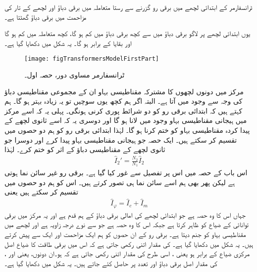 ٹرانسفارمر کے ابتدائی لچھے میں برقی رو   گزرنے سے رستا متعاملہ میں  برقی دباؤ اور لچھے کے تار کی مزاحمت  میں
  برقی دباؤ گھٹتا ہے۔

یوں ابتدائی لچھے  پر لاگو برقی دباؤ  میں سے کچھ برقی دباؤ  میں کم ہو گا،  کچھ  متعاملہ  میں کم ہو گا اور بقایا   کے برابر ہو گا۔  یہ شکل   میں دکھایا گیا ہے۔
\begin{figure}
\centering
\texttt{[image: figTransformersModelFirstPart]}
\caption{ٹرانسفارمر مساوی دور، حصہ اول۔}
\label{شکل_ٹرانسفارمر_ماڈل_حصہ_اول}
\end{figure}
%

مرکز میں دونوں لچھوں کا مشترکہ مقناطیسی بہاو ان کے مجموعی مقناطیسی دباؤ کی وجہ سے وجود میں آتا ہے۔ البتہ اگر ہم کچھ یوں سوچیں تو یہ زیادہ بہتر ہو گا۔ ہم کہتے ہیں کہ ابتدائی برقی رو کو دو شرائط پوری کرنی ہونگی۔ پہلی یہ کہ اسے مرکز میں ہیجانی مقناطیسی بہاو وجود میں لانا ہو گا اور دوسری یہ کہ اسے ثانوی لچھے کے پیدا کردہ مقناطیسی بہاو کو ختم کرنا ہو گا۔ لہٰذا ابتدائی برقی رو کو ہم دو حصوں میں تقسیم کر سکتے ہیں۔ ایک حصہ  جو ہیجانی مقناطیسی بہاو پیدا کرے اور دوسرا  جو ثانوی لچھے کے مقناطیسی دباؤ کے اثر کو ختم کرے۔ لہٰذا
\begin{align}
\hat{I}_2'=\frac{N_2}{N_1} \hat{I}_2
\end{align}
	اس باب کے حصہ   میں اس پر تفصیل سے غور کیا گیا ہے۔ برقی رو  غیر سائن نما ہوتی ہے لیکن پھر بھی  ہم اسے سائن نما   ہی تصور کرتے ہیں۔ اس کو ہم دو حصوں میں تقسیم کر سکتے ہیں یعنی
\begin{align}\label{مساوات_ٹرانسفارمر_رو_ہیجان_ضیاع_اجزاع}
\hat{I}_\varphi=\hat{I}_c+\hat{I}_m
\end{align}
جہاں  اس کا وہ حصہ ہے جو ابتدائی لچھے کی امالی برقی دباؤ  کے ہم قدم ہے اور یہ مرکز میں برقی توانائی کے ضیاع کو ظاہر کرتا ہے جبکہ  اس کا وہ حصہ ہے جو  سے نوے درجہ زاویہ   ہے اور  لچھے میں مقناطیسی بہاو کو جنم دیتا ہے۔ برقی رو کے ان حصوں کو ہم  ایک مزاحمت   اور ایک  سے پیش کرتے ہیں۔ یہ شکل میں دکھایا گیا ہے۔ کی مقدار اتنی رکھی جاتی ہے کہ اس میں برقی طاقت کا ضیاع اصل مرکزی ضیاع کے برابر ہو یعنی  ، اسی طرح  کی مقدار اتنی رکھی جاتی ہے کہ  ہو۔ان دونوں،  یعنی  اور  ، کی مقدار اصل برقی دباؤ اور تعدد پر حاصل کئے جاتے ہیں۔ یہ شکل   میں دکھایا گیا ہے۔

